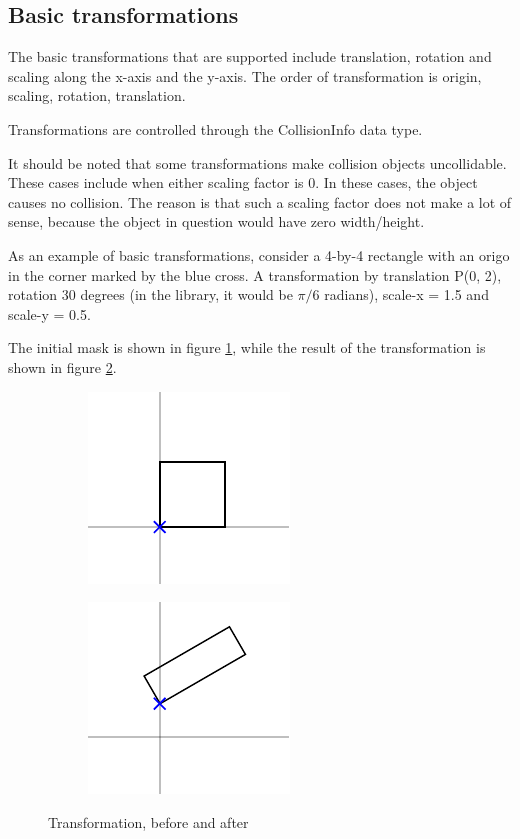 
\subsection{Basic transformations}

The basic transformations that are supported include
translation, rotation and scaling along the x-axis
and the y-axis. The order of transformation is
origin, scaling, rotation, translation.

Transformations are controlled through the CollisionInfo
data type.

It should be noted that some transformations make
collision objects uncollidable. These cases include
when either scaling factor is 0. In these cases,
the object causes no collision. The reason is that
such a scaling factor does not make a lot of sense,
because the object in question would have zero width/height.

As an example of basic transformations, consider a 4-by-4 rectangle
with an origo in the corner marked by the blue cross.
A transformation by translation P(0, 2), rotation 30 degrees
(in the library, it would be $\pi / 6$ radians), scale-x = 1.5
and scale-y = 0.5.

The initial mask is shown in figure \ref{fig:before_transformation},
while the result of the transformation is shown in figure \ref{fig:after_transformation}.

\begin{figure}[p]
	\centering
	\begin{subfigure}[b]{0.3\textwidth}
	  \centering
	  \includegraphics{transformations/before_transformation.pdf}
	  \label{fig:before_transformation}
	\end{subfigure}
	\begin{subfigure}[b]{0.3\textwidth}
	  \centering
	  \includegraphics{transformations/after_transformation.pdf}
	  \label{fig:after_transformation}
	\end{subfigure}
\caption{Transformation, before and after}
\label{fig:transformation}
\end{figure}

